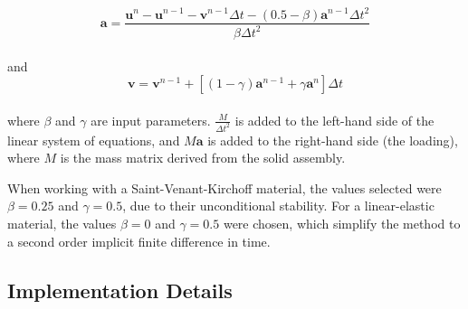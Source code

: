 \documentclass{article}
\begin{document}
\begin{equation}
	\mathbf{a} = \frac{\mathbf{u}^n - \mathbf{u}^{n-1} - \mathbf{v}^{n-1} \Delta t - ( 0.5 - \beta)   \mathbf{a}^{n-1}\Delta t^2}{\beta \Delta t^2}
\end{equation} \\

\noindent and \\

\begin{equation}
	\mathbf{v} = \mathbf{v}^{n-1} + [ (1 - \gamma) \mathbf{a}^{n-1} + \gamma \mathbf{a}^n]\Delta t 
\end{equation} \\

\noindent where $\beta$ and $\gamma$ are input parameters. $\frac{M}{\Delta t^2}$ is added to the left-hand side of the linear system of equations, and $M\mathbf{a}$ is added to the right-hand side (the loading), where $M$ is the mass matrix derived from the solid assembly.

When working with a Saint-Venant-Kirchoff material, the values selected were $\beta = 0.25$ and $\gamma = 0.5$, due to their unconditional stability. For a linear-elastic material, the values $\beta = 0$ and $\gamma = 0.5$ were chosen, which simplify the method to a second order implicit finite difference in time.



%

\subsection{Implementation Details}
\end{document}
